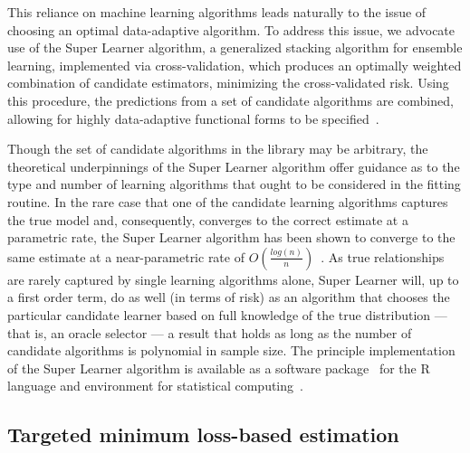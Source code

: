 This reliance on machine learning algorithms leads naturally to the issue of
choosing an optimal data-adaptive algorithm. To address this issue, we advocate
use of the Super Learner algorithm, a generalized stacking algorithm for
ensemble learning, implemented via cross-validation, which produces an optimally
weighted combination of candidate estimators, minimizing the cross-validated
risk. Using this procedure, the predictions from a set of candidate algorithms
are combined, allowing for highly data-adaptive functional forms to be
specified~\cite{van2007super}.

Though the set of candidate algorithms in the library may be arbitrary, the
theoretical underpinnings of the Super Learner algorithm offer guidance as to
the type and number of learning algorithms that ought to be considered in the
fitting routine. In the rare case that one of the candidate learning algorithms
captures the true model and, consequently, converges to the correct estimate at
a parametric rate, the Super Learner algorithm has been shown to converge to
the same estimate at a near-parametric rate of
$O\left(\frac{log(n)}{n}\right)$~\cite{van2007super}. As true relationships are
rarely captured by single learning algorithms alone, Super Learner will, up to a
first order term, do as well (in terms of risk) as an algorithm that chooses the
particular candidate learner based on full knowledge of the true distribution
--- that is, an oracle selector --- a result that holds as long as the number of
candidate algorithms is polynomial in sample size. The principle implementation
of the Super Learner algorithm is available as a software
package~\cite{van2007super} for the R language and environment for statistical
computing~\cite{R}.

\subsection{Targeted minimum loss-based estimation}\label{tmle}

